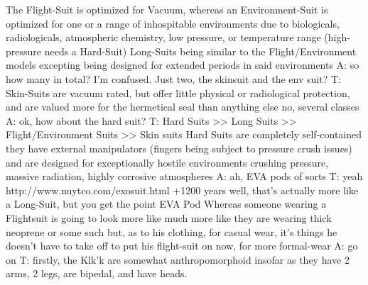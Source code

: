 The Flight-Suit is optimized for Vacuum, whereas an Environment-Suit is optimized for one or a range of inhospitable environments due to biologicals, radiologicals, atmospheric chemistry, low pressure, or temperature range
(high-pressure needs a Hard-Suit)
Long-Suits being similar to the Flight/Environment models excepting being designed for extended periods in said environments
A: so how many in total? I'm confused. Just two, the skinsuit and the env suit?
T: Skin-Suits are vacuum rated, but offer little physical or radiological protection, and are valued more for the hermetical seal than anything else
no, several classes
A: ok, how about the hard suit?
T: Hard Suits >> Long Suits >> Flight/Environment Suits >> Skin suits
Hard Suits are completely self-contained
they have external manipulators (fingers being subject to pressure crush issues)
and are designed for exceptionally hostile environments
crushing pressure, massive radiation, highly corrosive atmospheres
A: ah, EVA pods of sorts
T: yeah
http://www.nuytco.com/exosuit.html
+1200 years
well, that's actually more like a Long-Suit, but you get the point
EVA Pod
Whereas someone wearing a Flightsuit is going to look more like much more like they are wearing thick neoprene or some such
but, as to his clothing, for casual wear, it's things he doesn't have to take off to put his flight-suit on
now, for more formal-wear
A: go on
T: firstly, the Klk'k are somewhat anthropomorphoid insofar as they have 2 arms, 2 legs, are bipedal, and have heads.

